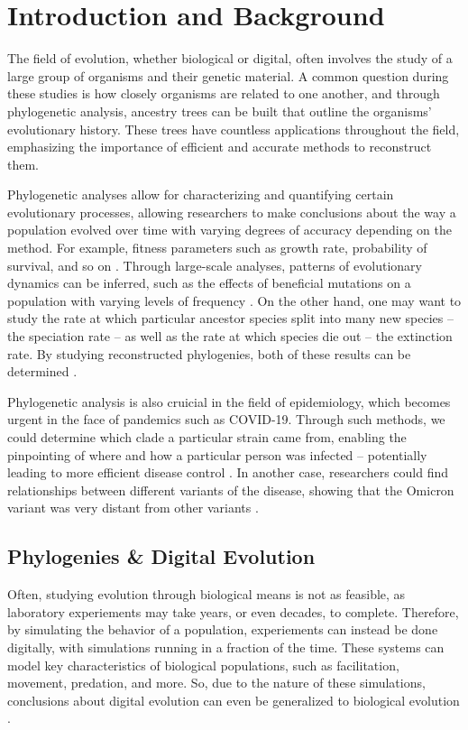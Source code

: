 \section{Introduction and Background} \label{sec:introduction}

The field of evolution, whether biological or digital, often involves the study of a large group of organisms and their genetic material. A common question during these studies is how closely organisms are related to one another, and through phylogenetic analysis, ancestry trees can be built that outline the organisms' evolutionary history. These trees have countless applications throughout the field, emphasizing the importance of efficient and accurate methods to reconstruct them.

Phylogenetic analyses allow for characterizing and quantifying certain evolutionary processes, allowing researchers to make conclusions about the way a population evolved over time with varying degrees of accuracy depending on the method. For example, fitness parameters such as growth rate, probability of survival, and so on \citep{genthon2023cell}. Through large-scale analyses, patterns of evolutionary dynamics can be inferred, such as the effects of beneficial mutations on a population with varying levels of frequency \citep{levy2015quantitative}. On the other hand, one may want to study the rate at which particular ancestor species split into many new species -- the speciation rate -- as well as the rate at which species die out -- the extinction rate. By studying reconstructed phylogenies, both of these results can be determined \citep{stadler2013recovering}.

Phylogenetic analysis is also cruicial in the field of epidemiology, which becomes urgent in the face of pandemics such as COVID-19. Through such methods, we could determine which clade a particular strain came from, enabling the pinpointing of where and how a particular person was infected -- potentially leading to more efficient disease control \citep{wang2020role}. In another case, researchers could find relationships between different variants of the disease, showing that the Omicron variant was very distant from other variants \citep{kandeel2021omicron}.

\subsection{Phylogenies \& Digital Evolution} \label{sec:introduction:digital}

Often, studying evolution through biological means is not as feasible, as laboratory experiements may take years, or even decades, to complete. Therefore, by simulating the behavior of a population, experiements can instead be done digitally, with simulations running in a fraction of the time. These systems can model key characteristics of biological populations, such as facilitation, movement, predation, and more. So, due to the nature of these simulations, conclusions about digital evolution can even be generalized to biological evolution \citep{dolson2021digital}.


